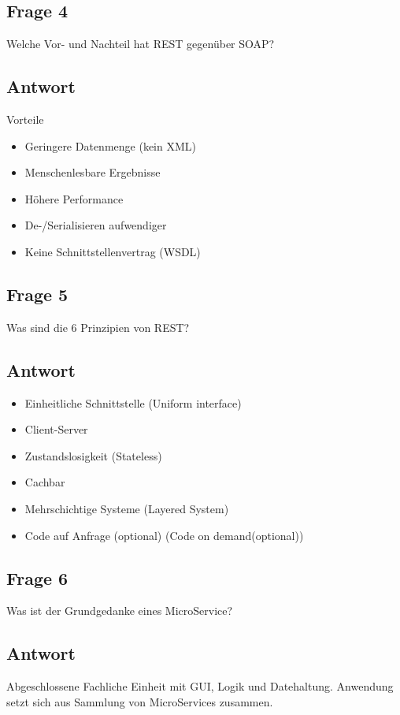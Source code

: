\subsection*{Frage 4}
Welche Vor- und Nachteil hat REST gegenüber SOAP?
\subsection*{Antwort}
Vorteile
\begin{itemize}
	\item Geringere Datenmenge (kein XML)
	\item Menschenlesbare Ergebnisse
	\item Höhere Performance
\end{itemize}

\begin{itemize}
	\item De-/Serialisieren aufwendiger
	\item Keine Schnittstellenvertrag (WSDL)
\end{itemize}
\subsection*{Frage 5}
Was sind die 6 Prinzipien von REST?
\subsection*{Antwort}
\begin{itemize}
	\item Einheitliche Schnittstelle (Uniform interface)
	\item Client-Server
	\item Zustandslosigkeit (Stateless)
	\item Cachbar
	\item Mehrschichtige Systeme (Layered System)
	\item Code auf Anfrage (optional) (Code on demand(optional))
\end{itemize}
\subsection*{Frage 6}
Was ist der Grundgedanke eines MicroService?
\subsection*{Antwort}
Abgeschlossene Fachliche Einheit mit GUI, Logik und Datehaltung. Anwendung setzt sich aus Sammlung von MicroServices zusammen.

